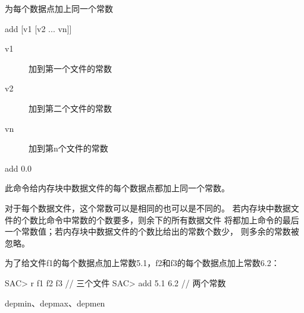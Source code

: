 \label{cmd:add}

为每个数据点加上同一个常数

\begin{SACSTX}
add [v1 [v2 ... vn]]
\end{SACSTX}

\begin{description}
\item [v1]  加到第一个文件的常数
\item [v2]  加到第二个文件的常数
\item [vn]  加到第n个文件的常数
\end{description}

\begin{SACDFT}
add 0.0
\end{SACDFT}

此命令给内存块中数据文件的每个数据点都加上同一个常数。

对于每个数据文件，这个常数可以是相同的也可以是不同的。
若内存块中数据文件的个数比命令中常数的个数要多，则余下的所有数据文件
将都加上命令的最后一个常数值；若内存块中数据文件的个数比给出的常数个数少，
则多余的常数被忽略。

为了给文件f1的每个数据点加上常数5.1，f2和f3的每个数据点加上常数6.2：
\begin{SACCode}
SAC> r f1 f2 f3         // 三个文件
SAC> add 5.1 6.2        // 两个常数
\end{SACCode}

depmin、depmax、depmen
